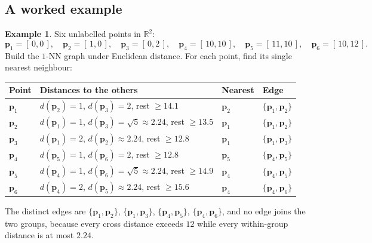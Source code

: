 \documentclass[11pt]{article}
\theoremstyle{plain}
\theoremstyle{definition}
\newtheorem{ex}{Example}[section]
\theoremstyle{remark}
\newcommand{\R}{\mathbb{R}}
\newcommand{\vc}[1]{\mathbf{#1}}
\begin{document}
\subsection{A worked example}
\begin{ex}
Six unlabelled points in $\R^{2}$:
\[
  \vc{p}_1=[\,0,0\,],\quad \vc{p}_2=[\,1,0\,],\quad \vc{p}_3=[\,0,2\,],
  \quad
  \vc{p}_4=[\,10,10\,],\quad \vc{p}_5=[\,11,10\,],\quad \vc{p}_6=[\,10,12\,].
\]
Build the $1$-NN graph under Euclidean distance. For each point, find its single
nearest neighbour:

\begin{center}
\renewcommand{\arraystretch}{1.25}
\begin{tabular}{@{}l l l l@{}}
\toprule
\textbf{Point} & \textbf{Distances to the others} & \textbf{Nearest}
  & \textbf{Edge} \\
\midrule
$\vc{p}_1$ & $d(\vc{p}_2)=1$, $d(\vc{p}_3)=2$, rest $\ge 14.1$
           & $\vc{p}_2$ & $\{\vc{p}_1,\vc{p}_2\}$ \\
$\vc{p}_2$ & $d(\vc{p}_1)=1$, $d(\vc{p}_3)=\sqrt5\approx2.24$, rest $\ge 13.5$
           & $\vc{p}_1$ & $\{\vc{p}_1,\vc{p}_2\}$ \\
$\vc{p}_3$ & $d(\vc{p}_1)=2$, $d(\vc{p}_2)\approx2.24$, rest $\ge 12.8$
           & $\vc{p}_1$ & $\{\vc{p}_1,\vc{p}_3\}$ \\
$\vc{p}_4$ & $d(\vc{p}_5)=1$, $d(\vc{p}_6)=2$, rest $\ge 12.8$
           & $\vc{p}_5$ & $\{\vc{p}_4,\vc{p}_5\}$ \\
$\vc{p}_5$ & $d(\vc{p}_4)=1$, $d(\vc{p}_6)=\sqrt5\approx2.24$, rest $\ge 14.9$
           & $\vc{p}_4$ & $\{\vc{p}_4,\vc{p}_5\}$ \\
$\vc{p}_6$ & $d(\vc{p}_4)=2$, $d(\vc{p}_5)\approx2.24$, rest $\ge 15.6$
           & $\vc{p}_4$ & $\{\vc{p}_4,\vc{p}_6\}$ \\
\bottomrule
\end{tabular}
\end{center}

\noindent The distinct edges are
$\{\vc{p}_1,\vc{p}_2\}$, $\{\vc{p}_1,\vc{p}_3\}$,
$\{\vc{p}_4,\vc{p}_5\}$, $\{\vc{p}_4,\vc{p}_6\}$, and no edge joins the two
groups, because every cross distance exceeds $12$ while every within-group
distance is at most $2.24$.


\end{ex}
\end{document}
